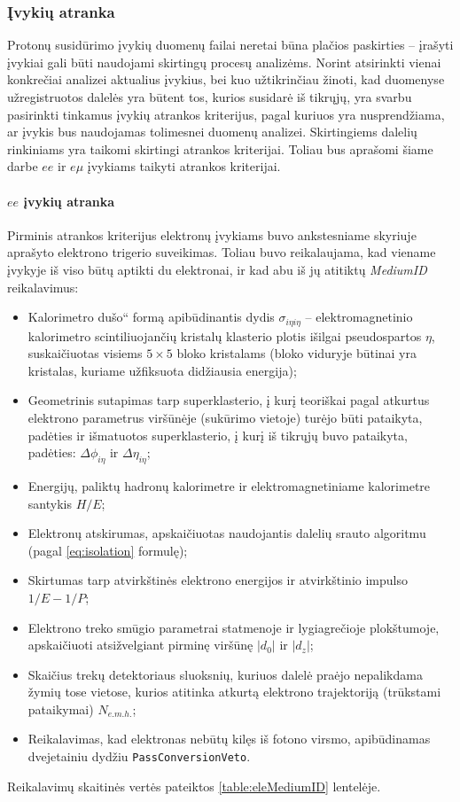\documentclass[a4paper, 12pt]{article}
\newcommand{\ltq}[1]{{\quotedblbase{}#1\textquotedblleft{}}}
\newlength\q
\begin{document}
\subsubsection{Įvykių atranka}

Protonų susidūrimo įvykių duomenų failai neretai būna plačios paskirties -- įrašyti įvykiai gali būti naudojami skirtingų procesų analizėms. Norint atsirinkti vienai konkrečiai analizei aktualius įvykius, bei kuo užtikrinčiau žinoti, kad duomenyse užregistruotos dalelės yra būtent tos, kurios susidarė iš tikrųjų, yra svarbu pasirinkti tinkamus įvykių atrankos kriterijus, pagal kuriuos yra nusprendžiama, ar įvykis bus naudojamas tolimesnei duomenų analizei. Skirtingiems dalelių rinkiniams yra taikomi skirtingi atrankos kriterijai. Toliau bus aprašomi šiame darbe $ee$ ir $e\mu$ įvykiams taikyti atrankos kriterijai.

\paragraph{$ee$ įvykių atranka\\}
Pirminis atrankos kriterijus elektronų įvykiams buvo ankstesniame skyriuje aprašyto elektrono trigerio suveikimas. Toliau buvo reikalaujama, kad viename įvykyje iš viso būtų aptikti du elektronai, ir kad abu iš jų atitiktų \textit{MediumID} \cite{MediumID8} reikalavimus:

\begin{itemize}
\item Kalorimetro \ltq{dušo} formą apibūdinantis dydis $\sigma_{i\eta i\eta}$ -- elektromagnetinio kalorimetro scintiliuojančių kristalų klasterio plotis išilgai pseudospartos $\eta$, suskaičiuotas visiems $5\!\times\!5$ bloko kristalams (bloko viduryje būtinai yra kristalas, kuriame užfiksuota didžiausia energija);
\item Geometrinis sutapimas tarp superklasterio, į kurį teoriškai pagal atkurtus elektrono parametrus viršūnėje (sukūrimo vietoje) turėjo būti pataikyta, padėties ir išmatuotos superklasterio, į kurį iš tikrųjų buvo pataikyta, padėties: $\Delta \phi_{i\eta}$ ir $\Delta\eta_{i\eta}$;
\item Energijų, paliktų hadronų kalorimetre ir elektromagnetiniame kalorimetre santykis $H/E$;
\item Elektronų atskirumas, apskaičiuotas naudojantis dalelių srauto algoritmu (pagal \eqref{eq:isolation} formulę);

\item Skirtumas tarp atvirkštinės elektrono energijos ir atvirkštinio impulso $1/E-1/P$;
\item Elektrono treko smūgio parametrai statmenoje ir lygiagrečioje plokštumoje, apskaičiuoti atsižvelgiant pirminę viršūnę $|d_{0}|$ ir $|d_{z}|$;
\item Skaičius trekų detektoriaus sluoksnių, kuriuos dalelė praėjo nepalikdama žymių tose vietose, kurios atitinka atkurtą elektrono trajektoriją (trūkstami pataikymai) $N_{e.m.h.}$;
\item Reikalavimas, kad elektronas nebūtų kilęs iš fotono virsmo, apibūdinamas dvejetainiu dydžiu \texttt{PassConversionVeto}.
\end{itemize}
Reikalavimų skaitinės vertės pateiktos \ref{table:eleMediumID} lentelėje.
\end{document}
